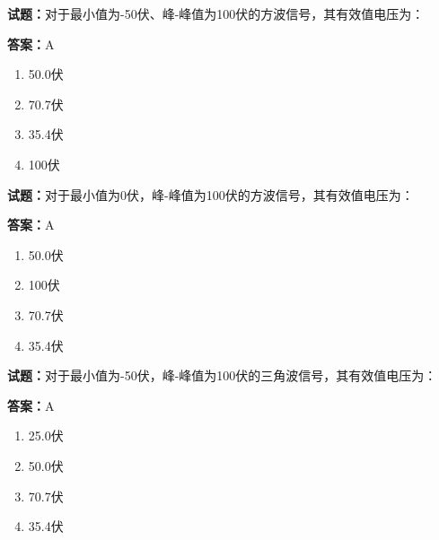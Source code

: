 \documentclass{ctexbook}
\begin{document}




\vspace{1em}

\textbf{试题：}对于最小值为-50伏、峰-峰值为100伏的方波信号，其有效值电压为： 

\textbf{答案：}A 

\begin{enumerate}[leftmargin=3em]
  \item 50.0伏 

  \item 70.7伏 

  \item 35.4伏 

  \item 100伏 

\end{enumerate}





\vspace{1em}

\textbf{试题：}对于最小值为0伏，峰-峰值为100伏的方波信号，其有效值电压为： 

\textbf{答案：}A 

\begin{enumerate}[leftmargin=3em]
  \item 50.0伏 

  \item 100伏 

  \item 70.7伏 

  \item 35.4伏 

\end{enumerate}





\vspace{1em}

\textbf{试题：}对于最小值为-50伏，峰-峰值为100伏的三角波信号，其有效值电压为： 

\textbf{答案：}A 

\begin{enumerate}[leftmargin=3em]
  \item 25.0伏 

  \item 50.0伏 

  \item 70.7伏 

  \item 35.4伏 

\end{enumerate}
\end{document}

